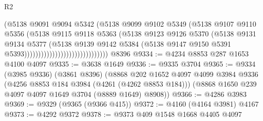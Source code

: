 \begin{lexlean}{R2}
\begin{coremodule}
                                                (@5138
                                                  @9091
                                                  @9094
                                                  @5342
                                                  (@5138
                                                    @9099
                                                    @9102
                                                    @5349
                                                    (@5138
                                                      @9107
                                                      @9110
                                                      @5356
                                                      (@5138
                                                        @9115
                                                        @9118
                                                        @5363
                                                        (@5138
                                                          @9123
                                                          @9126
                                                          @5370
                                                          (@5138
                                                            @9131
                                                            @9134
                                                            @5377
                                                            (@5138
                                                              @9139
                                                              @9142
                                                              @5384
                                                              (@5138
                                                                @9147
                                                                @9150
                                                                @5391
                                                                @5393))))))))))))))))))))))))))))))
    @8396
@9334 := @4234 @8853 @287 @1653 @4100 @4097
@9335 := @3638 @1649
@9336 := @9335 @3704
@9365 := @9334
    (@3985 @9336)
    (@3861 @8396)
    (@8868
      @202
      @1652
      @4097
      @4099
      @3984
      @9336
      (@4256 @8853 @184 @3984 (@4261 (@4262 @8853 @184)))
      (@8868 @1650 @239 @4097 @4097 @1649 @3704 (@8889 @1649) @8908))
@9366 := @4286 @3983
@9369 := @9329 (@9365 (@9366 @415))
@9372 := @4160 (@4164 @3981) @4167
@9373 := @4292 @9372
@9378 := @9373 @409 @1548 @1668 @4405 @4097

\end{coremodule}
\end{lexlean}
